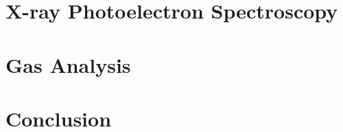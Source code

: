 \documentclass[xcolor=table, t, 9pt, head=0cm]{beamer}
\begin{document}
    \section{X-ray Photoelectron Spectroscopy}
        
        
        
        

    \section{Gas Analysis} %
        
        
        
        

    \section{Conclusion}
        
        

\appendix
    
    
\end{document}
